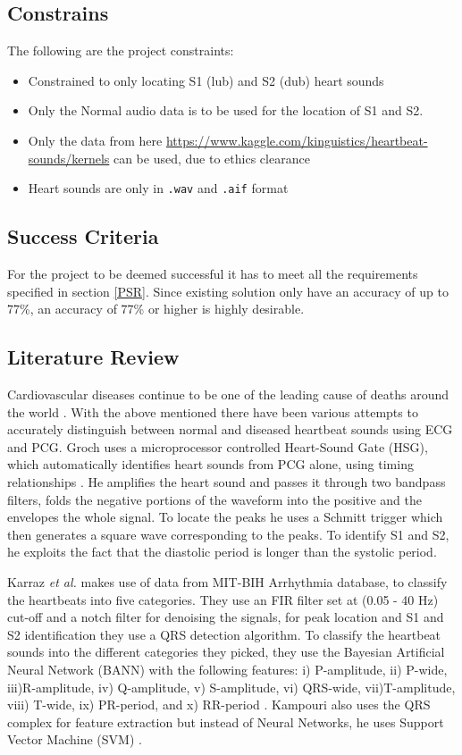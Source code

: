 \documentclass[10pt,twocolumn]{witseiepaper}
\begin{document}
\subsection{Constrains}
The following are the project constraints:

\begin{itemize}
    \item Constrained to only locating S1 (lub) and S2 (dub) heart sounds
    \item Only the Normal audio data is to be used for the location of S1 and S2.
    \item Only the data from here {\url{https://www.kaggle.com/kinguistics/heartbeat-sounds/kernels}} can be used, due to ethics clearance
    \item Heart sounds are only in \texttt{.wav} and \texttt{.aif} format
\end{itemize}
\subsection{Success Criteria}
For the project to be deemed successful it has to meet all the requirements specified in section \ref{PSR}. Since existing solution only have an accuracy of up to 77\%, an accuracy of 77\% or higher is highly desirable.

\subsection{Literature Review}
Cardiovascular diseases continue to be one of the leading cause of deaths around the world \cite{WHO}.  With the above mentioned there have been various attempts to accurately distinguish between normal and diseased heartbeat sounds using ECG and PCG.  Groch uses a microprocessor controlled Heart-Sound Gate (HSG), which automatically identifies heart sounds from PCG alone, using timing relationships \cite{groch1992new}. He amplifies the heart sound and passes it through two bandpass filters, folds the negative portions of the waveform into the positive and the envelopes the whole signal. To locate the peaks he uses a Schmitt trigger which then generates a square wave corresponding to the peaks. To identify S1 and S2, he exploits the fact that the diastolic period is longer than the systolic period. 

Karraz \textit{et al.} makes use of data from MIT-BIH Arrhythmia database, to classify the heartbeats into five categories. They use an FIR filter set at (0.05 - 40 Hz) cut-off and a notch filter for denoising the signals, for peak location and S1 and S2 identification they use a QRS detection algorithm. To classify the heartbeat sounds into the different categories they picked, they use the Bayesian Artificial Neural Network (BANN) with the following features: i) P-amplitude, ii) P-wide, iii)R-amplitude, iv) Q-amplitude, v) S-amplitude, vi) QRS-wide, vii)T-amplitude, viii) T-wide, ix) PR-period, and x) RR-period \cite{karraz2006automatic}. Kampouri  also uses the QRS complex for feature extraction but instead of Neural Networks, he uses Support Vector Machine (SVM) \cite{kampouraki2008heartbeat}.
\end{document}
